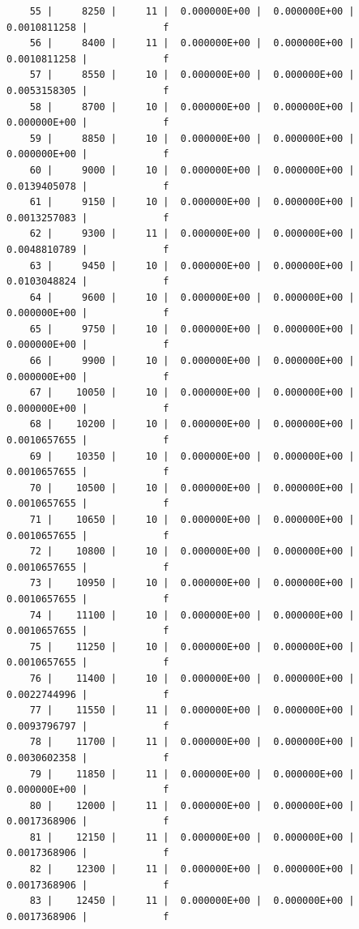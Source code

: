 \documentclass[
  authoryear,
  preprint,
  3p]{elsarticle}
\begin{document}
\begin{verbatim}
    55 |     8250 |     11 |  0.000000E+00 |  0.000000E+00 |  0.0010811258 |             f
    56 |     8400 |     11 |  0.000000E+00 |  0.000000E+00 |  0.0010811258 |             f
    57 |     8550 |     10 |  0.000000E+00 |  0.000000E+00 |  0.0053158305 |             f
    58 |     8700 |     10 |  0.000000E+00 |  0.000000E+00 |  0.000000E+00 |             f
    59 |     8850 |     10 |  0.000000E+00 |  0.000000E+00 |  0.000000E+00 |             f
    60 |     9000 |     10 |  0.000000E+00 |  0.000000E+00 |  0.0139405078 |             f
    61 |     9150 |     10 |  0.000000E+00 |  0.000000E+00 |  0.0013257083 |             f
    62 |     9300 |     11 |  0.000000E+00 |  0.000000E+00 |  0.0048810789 |             f
    63 |     9450 |     10 |  0.000000E+00 |  0.000000E+00 |  0.0103048824 |             f
    64 |     9600 |     10 |  0.000000E+00 |  0.000000E+00 |  0.000000E+00 |             f
    65 |     9750 |     10 |  0.000000E+00 |  0.000000E+00 |  0.000000E+00 |             f
    66 |     9900 |     10 |  0.000000E+00 |  0.000000E+00 |  0.000000E+00 |             f
    67 |    10050 |     10 |  0.000000E+00 |  0.000000E+00 |  0.000000E+00 |             f
    68 |    10200 |     10 |  0.000000E+00 |  0.000000E+00 |  0.0010657655 |             f
    69 |    10350 |     10 |  0.000000E+00 |  0.000000E+00 |  0.0010657655 |             f
    70 |    10500 |     10 |  0.000000E+00 |  0.000000E+00 |  0.0010657655 |             f
    71 |    10650 |     10 |  0.000000E+00 |  0.000000E+00 |  0.0010657655 |             f
    72 |    10800 |     10 |  0.000000E+00 |  0.000000E+00 |  0.0010657655 |             f
    73 |    10950 |     10 |  0.000000E+00 |  0.000000E+00 |  0.0010657655 |             f
    74 |    11100 |     10 |  0.000000E+00 |  0.000000E+00 |  0.0010657655 |             f
    75 |    11250 |     10 |  0.000000E+00 |  0.000000E+00 |  0.0010657655 |             f
    76 |    11400 |     10 |  0.000000E+00 |  0.000000E+00 |  0.0022744996 |             f
    77 |    11550 |     11 |  0.000000E+00 |  0.000000E+00 |  0.0093796797 |             f
    78 |    11700 |     11 |  0.000000E+00 |  0.000000E+00 |  0.0030602358 |             f
    79 |    11850 |     11 |  0.000000E+00 |  0.000000E+00 |  0.000000E+00 |             f
    80 |    12000 |     11 |  0.000000E+00 |  0.000000E+00 |  0.0017368906 |             f
    81 |    12150 |     11 |  0.000000E+00 |  0.000000E+00 |  0.0017368906 |             f
    82 |    12300 |     11 |  0.000000E+00 |  0.000000E+00 |  0.0017368906 |             f
    83 |    12450 |     11 |  0.000000E+00 |  0.000000E+00 |  0.0017368906 |             f

\end{verbatim}
\end{document}
